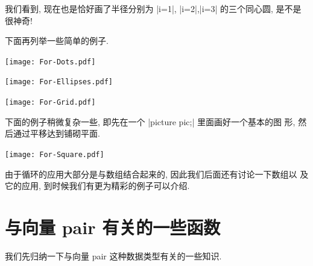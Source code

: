 \documentclass{ctexbook}
\begin{document}
我们看到, 现在也是恰好画了半径分别为 |i=1|, |i=2|,|i=3| 的三个同心圆,
是不是很神奇!

下面再列举一些简单的例子.
\begin{center}\texttt{[image: For-Dots.pdf]}\end{center}%


\begin{center}\texttt{[image: For-Ellipses.pdf]}\end{center}%


\begin{center}\texttt{[image: For-Grid.pdf]}\end{center}%


下面的例子稍微复杂一些, 即先在一个 |picture pic;| 里面画好一个基本的图
形, 然后通过平移达到铺砌平面.
\begin{center}\texttt{[image: For-Square.pdf]}\end{center}%


由于循环的应用大部分是与数组结合起来的, 因此我们后面还有讨论一下数组以
及它的应用, 到时候我们有更为精彩的例子可以介绍.

\section{与向量 pair  有关的一些函数}
我们先归纳一下与向量 pair 这种数据类型有关的一些知识.
\end{document}
